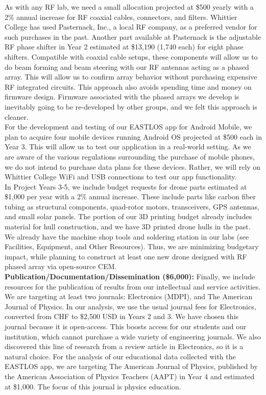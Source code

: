 \documentclass[11pt]{amsart}
\begin{document}
\noindent
As with any RF lab, we need a small allocation projected at \$500 yearly with a 2\% annual increase for RF coaxial cables, connectors, and filters. Whittier College has used Pasternack, Inc., a local RF company, as a preferred vendor for such purchases in the past. Another part available at Pasternack is the adjustable RF phase shifter in Year 2 estimated at \$13,190 (1,740 each) for eight phase shifters. Compatible with coaxial cable setups, these components will allow us to do beam forming and beam steering with our RF antennas acting as a phased array. This will allow us to confirm array behavior without purchasing expensive RF integrated circuits. This approach also avoids spending time and money on firmware design. Firmware associated with the phased arrays we develop is inevitably going to be re-developed by other groups, and we felt this approach is cleaner. \\

\noindent
For the development and testing of our EASTLOS app for Android Mobile, we plan to acquire four  mobile devices running Android OS projected at \$500 each in Year 3. This will allow us to test our application in a real-world setting. As we are aware of the various regulations surrounding the purchase of mobile phones, we do not intend to purchase data plans for these devices. Rather, we will rely on Whittier College WiFi and USB connections to test our app functionality. \\

\noindent
In Project Years 3-5, we include budget requests for drone parts estimated at \$1,000 per year with a 2\% annual increase. These include parts like carbon fiber tubing as structural components, quad-rotor motors, transceivers, GPS antennas, and small solar panels. The portion of our 3D printing budget already includes material for hull construction, and we have 3D printed drone hulls in the past. We already have the machine shop tools and soldering station in our labs (see Facilities, Equipment, and Other Resources). Thus, we are minimizing budgetary impact, while planning to construct at least one new drone designed with RF phased array via open-source CEM. \\

\noindent
\textbf{Publication/Documentation/Dissemination (\$6,000):} Finally, we include resources for the publication of results from our intellectual and service activities. We are targeting at least two journals: Electronics (MDPI), and The American Journal of Physics. In our analysis, we use the usual journal fees for Electronics, converted from CHF to \$2,500 USD in Years 2 and 3. We have chosen this journal because it is open-access. This boosts access for our students and our institution, which cannot purchase a wide variety of engineering journals. We also discovered this line of research from a review article in Electronics, so it is a natural choice. For the analysis of our educational data collected with the EASTLOS app, we are targeting The American Journal of Physics, published by the American Association of Physics Teachers (AAPT) in Year 4 and estimated at \$1,000. The focus of this journal is physics education. \\
\end{document}
